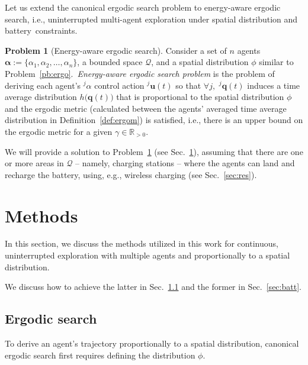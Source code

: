 \documentclass[letterpaper,10pt,conference,twoside]{IEEEtran}
\theoremstyle{definition}
\newtheorem{pb}{Problem}[section]
\begin{document}
Let us extend the canonical ergodic search problem to energy-aware ergodic search, i.e., uninterrupted multi-agent exploration %
under spatial distribution and battery~constraints.

\begin{pb}[Energy-aware ergodic search]\label{pb:enerergo}
  Consider a set of $n$ agents $\boldsymbol{\alpha}:=\{\alpha_1,\alpha_2,\dots,\alpha_n\}$, a bounded space $\mathcal{Q}$, and a spatial distribution $\phi$ similar to Problem~\ref{pb:ergo}.~\textit{Energy-aware ergodic search problem} is the problem of deriving each agent's ${}^j\alpha$ control action ${}^j\mathbf{u}(t)$ so that $\forall j,\,\,{}^j\mathbf{q}(t)$ induces a time average distribution $h\big(\mathbf{q}(t)\big)$ that is proportional to the spatial distribution $\phi$ and %
  the ergodic metric (calculated between the agents' averaged time average distribution in Definition~\ref{def:ergom}) is satisfied, i.e., there is an upper bound on the ergodic metric 
  for a given $\gamma\in\mathbb{R}_{>0}$.%
\end{pb}

We will provide a solution to Problem~\ref{pb:enerergo} (see Sec.~\ref{sec:meth}), assuming that there are one or more areas in $\mathcal{Q}$ -- namely, charging stations -- where the agents can land and recharge the battery, using, e.g., wireless charging (see Sec.~\ref{sec:res}). 


\section{Methods}\label{sec:meth}
\noindent
In this section, we discuss the methods utilized in this work for continuous, uninterrupted exploration with multiple agents and proportionally to a spatial distribution.

We discuss how to achieve the latter in Sec.~\ref{sec:ergosearch} and the former in Sec.~\ref{sec:batt}.

\subsection{Ergodic search}\label{sec:ergosearch}
\noindent
To derive an agent's trajectory proportionally to a spatial distribution, canonical ergodic search first requires defining the distribution $\phi$.
\end{document}
